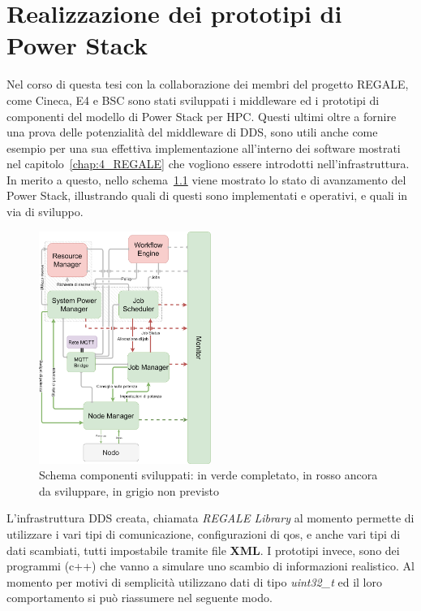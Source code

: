 \chapter{Realizzazione dei prototipi di Power Stack}
Nel corso di questa tesi con la collaborazione dei membri del progetto REGALE, come Cineca\cite{Cineca}, E4\cite{E4} e BSC\cite{BSC} sono stati sviluppati i middleware ed i prototipi di componenti del modello di Power Stack per HPC.
Questi ultimi oltre a fornire una prova delle potenzialità del middleware di DDS, sono utili anche come esempio per una sua effettiva implementazione all'interno dei software mostrati nel capitolo~\ref{chap:4_REGALE} che vogliono essere introdotti nell'infrastruttura.
In merito a questo, nello schema~\ref{fig:schema_global_dummy_implementati} viene mostrato lo stato di avanzamento del Power Stack, illustrando quali di questi sono implementati e operativi, e quali in via di sviluppo.

\begin{figure}[H]
    \centering
    \includegraphics[width=0.5\textwidth]{./img/SchemaPowerStack_perdummy.drawio.png} %
    \caption{Schema componenti sviluppati: in verde completato, in rosso ancora da sviluppare, in grigio non previsto}
    \label{fig:schema_global_dummy_implementati}
\end{figure}
L'infrastruttura DDS creata, chiamata \emph{REGALE Library}\cite{TODO} al momento permette di utilizzare i vari tipi di comunicazione, configurazioni di qos, e anche vari tipi di dati scambiati, tutti impostabile tramite file \textbf{XML}.
I prototipi invece, sono dei programmi (c++) che vanno a simulare uno scambio di informazioni realistico. Al momento per motivi di semplicità utilizzano dati di tipo \emph{uint32\_t} ed il loro comportamento si può riassumere nel seguente modo.

